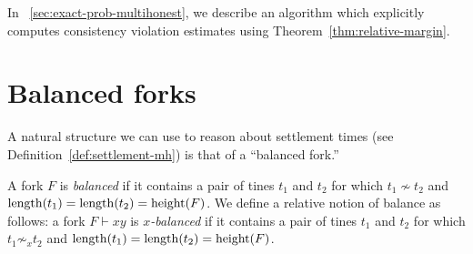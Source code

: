 In \Section~\ref{sec:exact-prob-multihonest}, 
we describe an algorithm which explicitly computes 
consistency violation estimates using Theorem~\ref{thm:relative-margin}.


\section{Balanced forks}

A natural structure we can use to reason about settlement times 
(see Definition~\ref{def:settlement-mh}) 
is that of a ``balanced fork.''

\begin{definition}\label{def:balanced-fork} A
  fork $F$ is \emph{balanced} if it contains a pair of tines $t_1$ and
  $t_2$ for which $t_1\nsim t_2$ and
  $\operatorname{length}(t_1)=\operatorname{length}(t_2)=\operatorname{height}(F)$. We define a relative notion
  of balance as follows: a fork $F \vdash xy$ is \emph{$x$-balanced}
  if it contains a pair of tines $t_1$ and $t_2$ for which
  $t_1 \not\sim_x t_2$ and $\operatorname{length}(t_1) = \operatorname{length}(t_2) = \operatorname{height}(F)$.
\end{definition}

